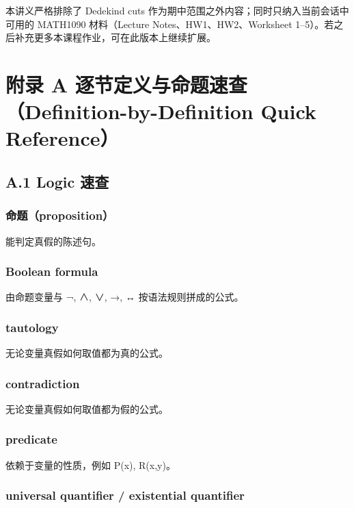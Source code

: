 \documentclass[
  11pt,
]{article}
\begin{document}
本讲义严格排除了 Dedekind cuts
作为期中范围之外内容；同时只纳入当前会话中可用的 MATH1090 材料（Lecture
Notes、HW1、HW2、Worksheet
1--5）。若之后补充更多本课程作业，可在此版本上继续扩展。

\section{附录 A 逐节定义与命题速查（Definition-by-Definition Quick
Reference）}\label{ux9644ux5f55-a-ux9010ux8282ux5b9aux4e49ux4e0eux547dux9898ux901fux67e5definition-by-definition-quick-reference}

\subsection{A.1 Logic 速查}\label{a.1-logic-ux901fux67e5}

\subsubsection{命题（proposition）}\label{ux547dux9898proposition-1}

能判定真假的陈述句。

\subsubsection{Boolean formula}\label{boolean-formula}

由命题变量与 ¬, ∧, ∨, →, ↔ 按语法规则拼成的公式。

\subsubsection{tautology}\label{tautology}

无论变量真假如何取值都为真的公式。

\subsubsection{contradiction}\label{contradiction}

无论变量真假如何取值都为假的公式。

\subsubsection{predicate}\label{predicate}

依赖于变量的性质，例如 P(x), R(x,y)。

\subsubsection{universal quantifier / existential
quantifier}\label{universal-quantifier-existential-quantifier}
\end{document}
